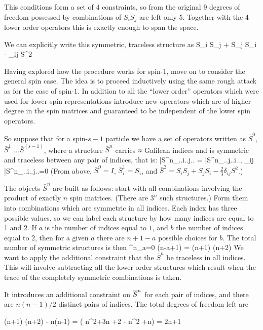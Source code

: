 This conditions form a set of 4 constraints, so from the original 9 degrees of freedom possessed by combinations of $S_i S_j$ are left only 5.  Together with the 4 lower order operators this is exactly enough to span the space.

We can explicitly write this symmetric, traceless structure as
\beq
	 S_i S_j + S_j S_i -  \delta_{ij} S^2
\eeq

Having explored how the procedure works for spin-1, move on to consider the general spin case.   The idea is to proceed inductively using the same rough attack as for the case of spin-$1$.  In addition to all the ``lower order'' operators which were used for lower spin representations introduce new operators which are of higher degree in the spin matrices and guaranteed to be independent of the lower spin operators.

So suppose that for a spin-$s-1$ particle we have a set of operators written as $\bar{S}^0$, $\bar{S}^1$ $\ldots \bar{S}^{(s-1)}$, where a structure $\bar{S}^n$ carries $n$ Galilean indices and is symmetric and traceless between any pair of indices, that is:
\beq
	\bar{S}^n_{..i..j..} = \bar{S}^n_{..j..i..}, \; \delta_{ij} \bar{S}^n_{..i..j..}=0
\eeq 
(From above, $\bar{S}^0=I$, $\bar{S}^1_i = S_i$, and $\bar{S}^2 = S_i S_j + S_j S_i - \frac{2}{3}\delta_{ij} S^2$.) 

The objects $\bar{S}^n$ are built as follows: start with all combinations involving the product of exactly $n$ spin matrices.  (There are $3^n$ such structures.)  Form them into combinations which are symmetric in all indices.  Each index has three possible values, so we can label each structure by how many indices are equal to 1 and 2.  If $a$ is the number of indices equal to $1$, and $b$ the number of indices equal to $2$, then for a given $a$ there are $n+1-a$ possible choices for $b$.  The total number of symmetric structures is then
\beq
	\sum^n_{a=0} (n-a+1) =  (n+1) (n+2)
\eeq
We want to apply the additional constraint that the $\bar{S}^n$ be traceless in all indices.  This will involve subtracting all the lower order structures which result when the trace of the completely symmetric combinations is taken.  %

It introduces an additional constraint on $\overline{S}^n$ for each pair of indices, and there are $n (n-1)/2$ distinct pairs of indices.  The total degrees of freedom left are

\beq
	 (n+1) (n+2) -  n(n-1) 
		= \left( n^2+3n +2 - n^2 +n\right )
		= 2n+1
\eeq

